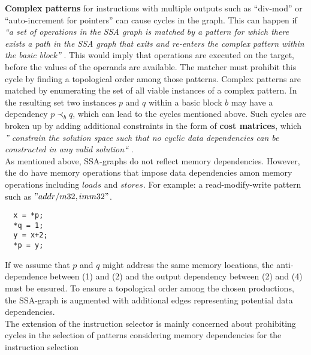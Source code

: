\documentclass[a4paper,10pt]{article}
\begin{document}
\textbf{Complex patterns} for instructions with multiple outputs such as ``div-mod'' or ``auto-increment for pointers'' can cause cycles in the graph. This can happen if \textit{``a set of operations in the SSA graph is matched by a pattern for which there exists a path in the SSA graph that exits and re-enters the complex pattern within the basic block''} \cite{pbqp-instruction-selection}. This would imply that operations are executed on the target, before the values of the operands are available. The matcher must prohibit this cycle by finding a topological order among those patterns. Complex patterns are matched by enumerating the set of all viable instances of a complex pattern. In the resulting set two instances $p$ and $q$ within a basic block $b$ may have a dependency $p \prec_b q$, which can lead to the cycles mentioned above. Such cycles are broken up by adding additional constraints in the form of \textbf{cost matrices}, which \textit{'' constrain the solution space such that no cyclic data dependencies can be constructed in any valid solution``} \cite{pbqp-instruction-selection}.\\

As mentioned above, SSA-graphs do not reflect memory dependencies. However, the do have memory operations that impose data dependencies amon memory operations including $loads$ and $stores$. For example: a read-modify-write pattern such as $"add r/m32, imm32"$. \\
\begin{lstlisting}
  x = *p;
  *q = 1;
  y = x+2;
  *p = y;
\end{lstlisting}

If we assume that $p$ and $q$ might address the same memory locations, the anti-dependence between (1) and (2) and the output dependency between (2) and (4) must be ensured. To ensure a topological order among the chosen productions, the SSA-graph is augmented with additional edges representing potential data dependencies.\\

The extension of the instruction selector is mainly concerned about prohibiting cycles in the selection of patterns considering memory dependencies for the instruction selection\\
\end{document}
